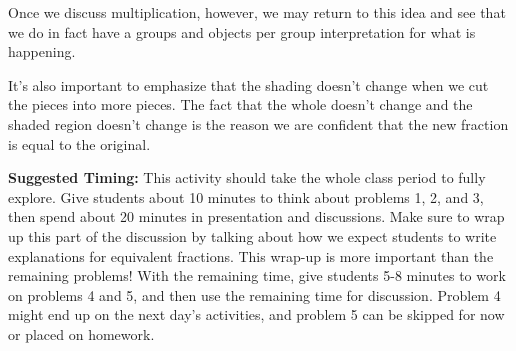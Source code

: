 \documentclass[nooutcomes,noauthor,handout]{ximera}
\begin{document}
\begin{instructorNotes}
Once we discuss multiplication, however, we may return to this idea and see that we do in fact have a groups and objects per group interpretation for what is happening.

It's also important to emphasize that the shading doesn't change when we cut the pieces into more pieces. The fact that the whole doesn't change and the shaded region doesn't change is the reason we are confident that the new fraction is equal to the original.



{\bf Suggested Timing:} This activity should take the whole class period to fully explore. Give students about 10 minutes to think about problems 1, 2, and 3, then spend about 20 minutes in presentation and discussions. Make sure to wrap up this part of the discussion by talking about how we expect students to write explanations for equivalent fractions. This wrap-up is more important than the remaining problems! With the remaining time, give students 5-8 minutes to work on problems 4 and 5, and then use the remaining time for discussion. Problem 4 might end up on the next day's activities, and problem 5 can be skipped for now or placed on homework.
\end{instructorNotes}
\end{document}
